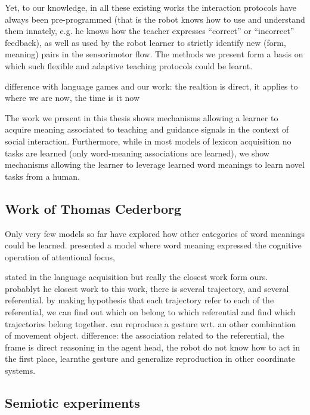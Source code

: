 Yet, to our knowledge, in all these existing works the interaction protocols have always been pre-programmed (that is the robot knows how to use and understand them innately, e.g. he knows how the teacher expresses ``correct'' or ``incorrect'' feedback), as well as used by the robot learner to strictly identify new (form, meaning) pairs in the sensorimotor flow. The methods we present form a basis on which such flexible and adaptive teaching protocols could be learnt.

difference with language games and our work: the realtion is direct, it applies to where we are now, the time is it now

The work we present in this thesis shows mechanisms allowing a learner to acquire meaning associated to teaching and guidance signals in the context of social interaction. Furthermore, while in most models of lexicon  acquisition no tasks are learned (only word-meaning associations are learned), we show mechanisms allowing the learner to leverage learned word meanings to learn novel tasks from a human.

\subsection{Work of Thomas Cederborg}

Only very few models so far have explored how other categories of word meanings could be learned. \cite{cederborg2011imitating} presented a model where word meaning expressed the cognitive operation of attentional focus, 


stated in the language acquisition but really the closest work form ours. \cite{cederborg2011imitating} probablyt he closest work to this work, there is several trajectory, and several referential. by making hypothesis that each trajectory refer to each of the referential, we can find out which on belong to which referential and find which trajectories belong together. can reproduce a gesture wrt. an other combination of movement object. 
difference: the association related to the referential, the frame is direct reasoning in the agent head, the robot do not know how to act in the first place, learnthe gesture and generalize reproduction in other coordinate systems.


\subsection{Semiotic experiments} 


